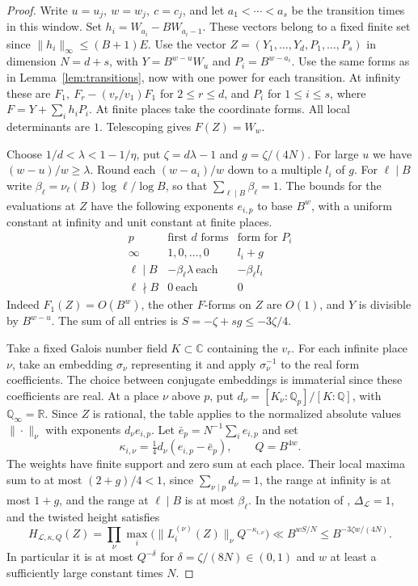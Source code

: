 \documentclass[11pt,reqno,a4paper]{amsart}
\theoremstyle{remark}
\begin{document}
\begin{proof}
Write \(u=u_j,\ w=w_j,\ c=c_j\), and let \(a_1<\cdots<a_s\) be
the transition times in this window. Set \(h_i=W_{a_i}-BW_{a_i-1}\).
These vectors belong to a fixed finite set since
\(\|h_i\|_\infty\le(B+1)E\). Use the vector
\(Z=(Y_1,\ldots,Y_d,P_1,\ldots,P_s)\) in dimension \(N=d+s\), with
\(Y=B^{w-u}W_u\) and \(P_i=B^{w-a_i}\). Use the same forms as in
Lemma~\ref{lem:transitions}, now with one power for each transition.
At infinity these are \(F_1,\ F_r-(v_r/v_1)F_1\) for \(2\le r\le d\),
and \(P_i\) for \(1\le i\le s\), where \(F=Y+\sum_i h_iP_i\).
At finite places take the coordinate forms. All local determinants
are \(1\). Telescoping gives \(F(Z)=W_w\).

Choose \(1/d<\lambda<1-1/\eta\), put \(\zeta=d\lambda-1\) and
\(g=\zeta/(4N)\). For large \(u\) we have \((w-u)/w\ge\lambda\).
Round each \((w-a_i)/w\) down to a multiple \(l_i\) of \(g\).
For \(\ell\mid B\) write
\(\beta_\ell=\nu_\ell(B)\log\ell/\log B\), so that
\(\sum_{\ell\mid B}\beta_\ell=1\). The bounds for the evaluations
at \(Z\) have the following exponents \(e_{i,p}\) to base \(B^w\),
with a uniform constant at infinity and unit constant at finite places.
\[
 \begin{array}{c|cc}
 p & \text{first \(d\) forms} & \text{form for \(P_i\)}\\ \hline
 \infty & 1,0,\ldots,0 & l_i+g\\
 \ell\mid B & -\beta_\ell\lambda\ \text{each} & -\beta_\ell l_i\\
 \ell\nmid B & 0\ \text{each} & 0
 \end{array}
\]
Indeed \(F_1(Z)=O(B^w)\), the other \(F\)-forms on \(Z\) are
\(O(1)\), and \(Y\) is divisible by \(B^{w-u}\). The sum of all
entries is \(S=-\zeta+sg\le-3\zeta/4\).


Take a fixed Galois number field \(K\subset\mathbb C\) containing
the \(v_r\). For each infinite place \(\nu\), take an embedding
\(\sigma_\nu\) representing it and apply \(\sigma_\nu^{-1}\) to the
real form coefficients. The choice between conjugate embeddings is
immaterial since these coefficients are real. At a place \(\nu\)
above \(p\), put \(d_\nu=[K_\nu:\mathbb Q_p]/[K:\mathbb Q]\), with
\(\mathbb Q_\infty=\mathbb R\). Since \(Z\) is rational, the table
applies to the normalized absolute values \(\|\cdot\|_\nu\) with
exponents \(d_\nu e_{i,p}\). Let \(\bar e_p=N^{-1}\sum_i e_{i,p}\)
and set
\[
 \kappa_{i,\nu}=\tfrac14 d_\nu(e_{i,p}-\bar e_p),\qquad Q=B^{4w}.
\]
The weights have finite support and zero sum at each place.
Their local maxima sum to at most \((2+g)/4<1\), since
\(\sum_{\nu\mid p}d_\nu=1\), the range at infinity is at most
\(1+g\), and the range at \(\ell\mid B\) is at most \(\beta_\ell\).
In the notation of \cite[(2.4)--(2.15)]{cnt-evertse-ferretti},
\(\Delta_{\mathcal L}=1\), and the twisted height satisfies
\[
 H_{\mathcal L,\kappa,Q}(Z)
 =\prod_\nu\max_i\bigl(\|L_i^{(\nu)}(Z)\|_\nu Q^{-\kappa_{i,\nu}}\bigr)
 \ll B^{wS/N}\le B^{-3\zeta w/(4N)}.
\]
In particular it is at most \(Q^{-\delta}\) for
\(\delta=\zeta/(8N)\in(0,1)\) and \(w\) at least a sufficiently
large constant times \(N\).


\end{proof}
\end{document}
